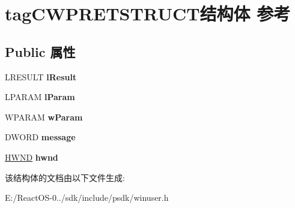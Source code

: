 \hypertarget{structtag_c_w_p_r_e_t_s_t_r_u_c_t}{}\section{tag\+C\+W\+P\+R\+E\+T\+S\+T\+R\+U\+C\+T结构体 参考}
\label{structtag_c_w_p_r_e_t_s_t_r_u_c_t}
\subsection*{Public 属性}
\begin{DoxyCompactItemize}
\item 
\mbox{\label{structtag_c_w_p_r_e_t_s_t_r_u_c_t_a77e822db061c0811e8cbee2ffb91f3b1}} 
L\+R\+E\+S\+U\+LT {\bfseries l\+Result}
\item 
\mbox{\label{structtag_c_w_p_r_e_t_s_t_r_u_c_t_a9939db2903fb07dc43b960e61126f2a6}} 
L\+P\+A\+R\+AM {\bfseries l\+Param}
\item 
\mbox{\label{structtag_c_w_p_r_e_t_s_t_r_u_c_t_a2338a596fcfe928468a106fdcc16e571}} 
W\+P\+A\+R\+AM {\bfseries w\+Param}
\item 
\mbox{\label{structtag_c_w_p_r_e_t_s_t_r_u_c_t_a09baeec52e1c54ddd5ef599bf5838f2c}} 
D\+W\+O\+RD {\bfseries message}
\item 
\mbox{\label{structtag_c_w_p_r_e_t_s_t_r_u_c_t_ac3fe6e47717e1340d17e96d00eea61bf}} 
\hyperlink{interfacevoid}{H\+W\+ND} {\bfseries hwnd}
\end{DoxyCompactItemize}


该结构体的文档由以下文件生成\+:\begin{DoxyCompactItemize}
\item 
E\+:/\+React\+O\+S-\/0../sdk/include/psdk/winuser.\+h\end{DoxyCompactItemize}
